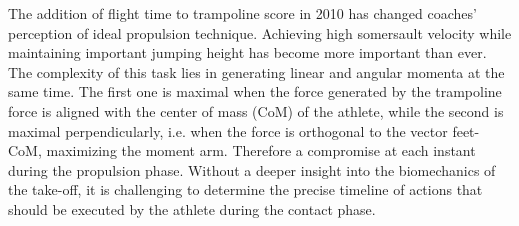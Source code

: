 
The addition of flight time to trampoline score in 2010 \cite{Committee2010} has changed coaches' perception of ideal propulsion technique.
Achieving high somersault velocity while maintaining important jumping height has become more important than ever.
The complexity of this task lies in generating linear and angular momenta at the same time.
The first one is maximal when the force generated by the trampoline force is aligned with the center of mass (CoM) of the athlete, while the second is maximal perpendicularly, i.e. when the force is orthogonal to the vector feet-CoM, maximizing the moment arm. 
Therefore a compromise at each instant during the propulsion phase.
Without a deeper insight into the biomechanics of the take-off, it is challenging to determine the precise timeline of actions that should be executed by the athlete during the contact phase.


